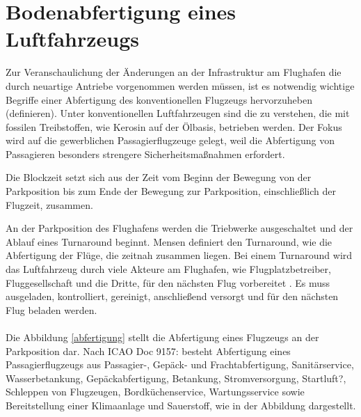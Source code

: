 \section{Bodenabfertigung eines Luftfahrzeugs}
\label{s:Bodenabfertigung eines Luftfahrzeugs}

Zur Veranschaulichung der Änderungen an der Infrastruktur am Flughafen die durch neuartige Antriebe vorgenommen werden müssen, 
ist es notwendig wichtige Begriffe einer Abfertigung des konventionellen Flugzeugs hervorzuheben (definieren). 
Unter konventionellen Luftfahrzeugen sind die zu verstehen,
die mit fossilen Treibstoffen, wie Kerosin auf der Ölbasis, betrieben werden. Der Fokus wird auf die gewerblichen Passagierflugzeuge gelegt,
weil die Abfertigung von Passagieren besonders strengere Sicherheitsmaßnahmen erfordert.


Die Blockzeit setzt sich aus der Zeit vom Beginn der Bewegung von der Parkposition bis zum Ende der Bewegung zur Parkposition, 
einschließlich der Flugzeit, zusammen.

An der Parkposition des Flughafens werden die Triebwerke ausgeschaltet und der Ablauf eines Turnaround beginnt. 
Mensen \cite{mensen2013handbuch} definiert den Turnaround, wie die Abfertigung der Flüge, die zeitnah zusammen liegen.
Bei einem Turnaround wird das Luftfahrzeug durch viele Akteure am Flughafen, wie Flugplatzbetreiber, Fluggesellschaft und die Dritte, für 
den nächsten Flug vorbereitet \cite{mensen2013handbuch}. Es muss ausgeladen, kontrolliert, gereinigt, anschließend versorgt 
und für den nächsten Flug beladen werden. \\
\\
Die Abbildung \ref{abfertigung} stellt die Abfertigung eines Flugzeugs an der Parkposition dar.
Nach ICAO Doc 9157: besteht Abfertigung eines Passagierflugzeugs aus Passagier-, Gepäck- und Frachtabfertigung, 
Sanitärservice, Wasserbetankung, Gepäckabfertigung, Betankung, Stromversorgung,
Startluft?, Schleppen von Flugzeugen, Bordküchenservice, Wartungsservice sowie Bereitstellung einer Klimaanlage und Sauerstoff,
wie in der Abbildung dargestellt.

